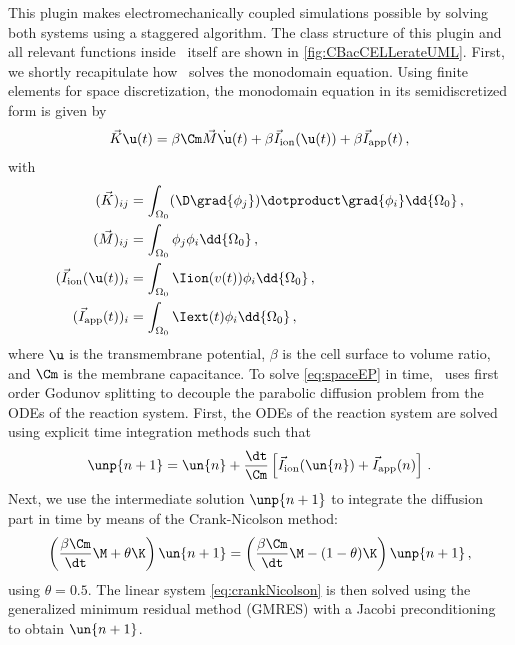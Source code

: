 This plugin makes electromechanically coupled simulations possible by solving both systems using a staggered algorithm.
The class structure of this plugin and all relevant functions inside \ACC~itself are shown in \autoref{fig:CBacCELLerateUML}.
First, we shortly recapitulate how \ACC~solves the monodomain equation.
Using finite elements for space discretization, the monodomain equation in its semidiscretized form is given by
\begin{equation}
    \vec K \u(t) = \beta \Cm \vec M \dot{\u}(t) + \beta \vec I_\mathrm{ion}(\u(t)) + \beta \vec I_\mathrm{app}(t) \label{eq:spaceEP} \,,
\end{equation}
with
\begin{align*}
    (\vec K)_{ij} &= \int_{\Omega_0} ( \D \grad{\phi_j}) \dotproduct \grad{\phi_i} \dd{\Omega_0} \,, \\
    (\vec M)_{ij} &= \int_{\Omega_0} \phi_j \phi_i \dd{\Omega_0} \,, \\
    (\vec I_\mathrm{ion}(\u(t))_i &= \int_{\Omega_0} \Iion(v(t)) \phi_i \dd{\Omega_0} \,, \\
    (\vec I_\mathrm{app}(t))_i &= \int_{\Omega_0} \Iext(t) \phi_i \dd{\Omega_0} \,,
\end{align*}
where $\u$ is the transmembrane potential, $\beta$ is the cell surface to volume ratio, and $\Cm$ is the membrane capacitance.
To solve \autoref{eq:spaceEP} in time, \ACC~uses first order Godunov splitting to decouple the parabolic diffusion problem from the ODEs of the reaction system.
First, the ODEs of the reaction system are solved using explicit time integration methods such that
\begin{equation}
    \unp{n+1} = \un{n} + \frac{\dt}{\Cm}\left[ \vec I_\mathrm{ion}(\un{n}) + \vec I_\mathrm{app}(n) \right] \,. \label{eq:voltage}
\end{equation}
Next, we use the intermediate solution $\unp{n+1}$ to integrate the diffusion part in time by means of the Crank-Nicolson method:
\begin{equation}
    \left( \frac{\beta \Cm}{\dt} \M + \theta \K \right) \un{n+1} = \left( \frac{\beta \Cm}{\dt} \M - (1 - \theta) \K \right) \unp{n+1} \label{eq:crankNicolson} \,,
\end{equation}
using $\theta = 0.5$.
The linear system \eqref{eq:crankNicolson} is then solved using the generalized minimum residual method (GMRES) with a Jacobi preconditioning to obtain $\un{n+1}$.

